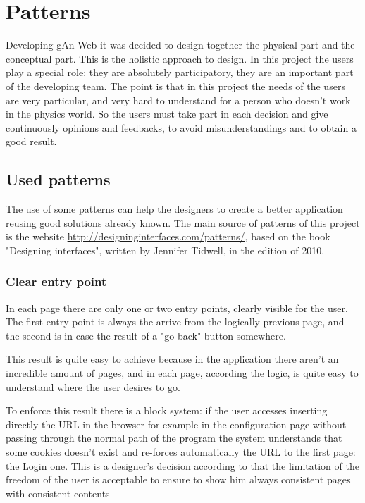 
\chapter{Patterns} %

\label{Chapter8} %

Developing gAn Web it was decided to design together the physical part and the conceptual part. This is the holistic approach to design. In this project the users play a special role: they are absolutely participatory, they are an important part of the developing team.
The point is that in this project the needs of the users are very particular, and very hard to understand for a person who doesn't work in the physics world. So the users must take part in each decision and give continuously opinions and feedbacks, to avoid misunderstandings and to obtain a good result.

\section{Used patterns}

The use of some patterns can help the designers to create a better application reusing good solutions already known.
The main source of patterns of this project is the website \url{http://designinginterfaces.com/patterns/}, based on the book "Designing interfaces", written by Jennifer Tidwell, in the edition of 2010.

\subsection{Clear entry point} 

In each page there are only one or two entry points, clearly visible for the user.
The first entry point is always the arrive from the logically previous page, and the second is in case the result of a "go back" button somewhere.

This result is quite easy to achieve because in the application there aren't an incredible amount of pages, and in each page, according the logic, is quite easy to understand where the user desires to go. 

To enforce this result there is a block system: if the user accesses inserting directly the URL in the browser for example in the configuration page without passing through the normal path of the program the system understands that some cookies doesn't exist and re-forces automatically the URL to the first page: the Login one. This is a designer's decision according to that the limitation of the freedom of the user is acceptable to ensure to show him always consistent pages with consistent contents

